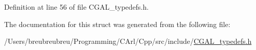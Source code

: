Definition at line 56 of file C\+G\+A\+L\+\_\+typedefs.\+h.



The documentation for this struct was generated from the following file\+:\begin{DoxyCompactItemize}
\item 
/\+Users/breubreubreu/\+Programming/\+C\+Arl/\+Cpp/src/include/\hyperlink{_c_g_a_l__typedefs_8h}{C\+G\+A\+L\+\_\+typedefs.\+h}\end{DoxyCompactItemize}

